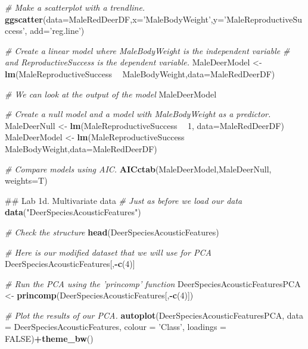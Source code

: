 \documentclass[]{book}
\newenvironment{Shaded}{\begin{snugshade}}{\end{snugshade}}
\newcommand{\CommentTok}[1]{\textcolor[rgb]{0.56,0.35,0.01}{\textit{#1}}}
\newcommand{\DataTypeTok}[1]{\textcolor[rgb]{0.13,0.29,0.53}{#1}}
\newcommand{\DecValTok}[1]{\textcolor[rgb]{0.00,0.00,0.81}{#1}}
\newcommand{\KeywordTok}[1]{\textcolor[rgb]{0.13,0.29,0.53}{\textbf{#1}}}
\newcommand{\NormalTok}[1]{#1}
\newcommand{\OperatorTok}[1]{\textcolor[rgb]{0.81,0.36,0.00}{\textbf{#1}}}
\newcommand{\OtherTok}[1]{\textcolor[rgb]{0.56,0.35,0.01}{#1}}
\newcommand{\StringTok}[1]{\textcolor[rgb]{0.31,0.60,0.02}{#1}}
\begin{document}
\begin{Shaded}
\begin{Highlighting}[]
\CommentTok{# Make a scatterplot with a trendline.}
\KeywordTok{ggscatter}\NormalTok{(}\DataTypeTok{data=}\NormalTok{MaleRedDeerDF,}\DataTypeTok{x=}\StringTok{'MaleBodyWeight'}\NormalTok{,}\DataTypeTok{y=}\StringTok{'MaleReproductiveSuccess'}\NormalTok{,}
          \DataTypeTok{add=}\StringTok{'reg.line'}\NormalTok{)}

\CommentTok{# Create a linear model where MaleBodyWeight is the independent variable}
\CommentTok{# and ReproductiveSuccess is the dependent variable.}
\NormalTok{MaleDeerModel <-}\StringTok{ }\KeywordTok{lm}\NormalTok{(MaleReproductiveSuccess }\OperatorTok{~}\StringTok{ }\NormalTok{MaleBodyWeight,}\DataTypeTok{data=}\NormalTok{MaleRedDeerDF)}

\CommentTok{# We can look at the output of the model  }
\NormalTok{MaleDeerModel}

\CommentTok{# Create a null model and a model with MaleBodyWeight as a predictor.}
\NormalTok{MaleDeerNull <-}\StringTok{ }\KeywordTok{lm}\NormalTok{(MaleReproductiveSuccess }\OperatorTok{~}\StringTok{ }\DecValTok{1}\NormalTok{, }\DataTypeTok{data=}\NormalTok{MaleRedDeerDF)}
\NormalTok{MaleDeerModel <-}\StringTok{ }\KeywordTok{lm}\NormalTok{(MaleReproductiveSuccess }\OperatorTok{~}\StringTok{ }\NormalTok{MaleBodyWeight,}\DataTypeTok{data=}\NormalTok{MaleRedDeerDF)}

\CommentTok{# Compare models using AIC.}
\KeywordTok{AICctab}\NormalTok{(MaleDeerModel,MaleDeerNull, }\DataTypeTok{weights=}\NormalTok{T)}

\NormalTok{## Lab 1d. Multivariate data}
\CommentTok{# Just as before we load our data}
\KeywordTok{data}\NormalTok{(}\StringTok{"DeerSpeciesAcousticFeatures"}\NormalTok{)}

\CommentTok{# Check the structure}
\KeywordTok{head}\NormalTok{(DeerSpeciesAcousticFeatures)}

\CommentTok{# Here is our modified dataset that we will use for PCA}
\NormalTok{DeerSpeciesAcousticFeatures[,}\OperatorTok{-}\KeywordTok{c}\NormalTok{(}\DecValTok{4}\NormalTok{)] }

\CommentTok{# Run the PCA using the 'princomp' function}
\NormalTok{DeerSpeciesAcousticFeaturesPCA <-}\StringTok{ }\KeywordTok{princomp}\NormalTok{(DeerSpeciesAcousticFeatures[,}\OperatorTok{-}\KeywordTok{c}\NormalTok{(}\DecValTok{4}\NormalTok{)])}

\CommentTok{# Plot the results of our PCA.}
\KeywordTok{autoplot}\NormalTok{(DeerSpeciesAcousticFeaturesPCA, }\DataTypeTok{data =}\NormalTok{ DeerSpeciesAcousticFeatures, }\DataTypeTok{colour =} \StringTok{'Class'}\NormalTok{,}
         \DataTypeTok{loadings =} \OtherTok{FALSE}\NormalTok{)}\OperatorTok{+}\KeywordTok{theme_bw}\NormalTok{()}


\end{Highlighting}
\end{Shaded}
\end{document}
